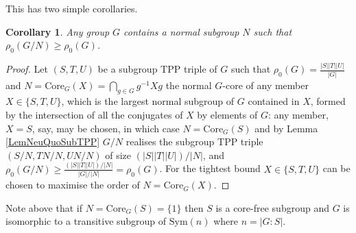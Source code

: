 \documentclass{amsart}
\theoremstyle{observation}
\newtheorem{corollary}[theorem]{Corollary}
\theoremstyle{definition}
\theoremstyle{remark}
\numberwithin{equation}{section}
\begin{document}
This has two simple corollaries.

\begin{corollary}\label{Corr1LemNeuQuoSubTPP} Any group $G$ contains a normal subgroup $N$ such that $\rho_0(G/N) \geq \rho_0(G)$.
\end{corollary}
\begin{proof} Let $(S, T, U)$ be a subgroup TPP triple of $G$ such that $\rho_0(G) = \frac{|S||T||U|}{|G|}$ and $N = \text{Core}_G(X) = \bigcap_{g \in G}g^{-1}Xg$ the normal $G$-core of any member $X \in \{S, T, U\}$, which is the largest normal subgroup of $G$ contained in $X$, formed by the intersection of all the conjugates of $X$ by elements of $G$: any member, $X = S$, say, may be chosen, in which case $N = \text{Core}_G(S)$ and by Lemma \ref{LemNeuQuoSubTPP} $G/N$ realises the subgroup TPP triple $(S/N,TN/N, UN/N)$ of size $(|S||T||U|)/|N|$, and $\rho_0(G/N) \geq \frac{(|S||T||U|)/|N|}{|G|/|N|} = \rho_0(G)$. For the tightest bound $X \in \{S, T, U\}$ can be chosen to maximise the order of $N = \text{Core}_G(X)$.
\end{proof}

Note above that if $N = \text{Core}_G(S) = \{1\}$ then $S$ is a core-free subgroup and $G$ is isomorphic to a transitive subgroup of $\text{Sym}(n)$ where $n = |G:S|$.
\end{document}
